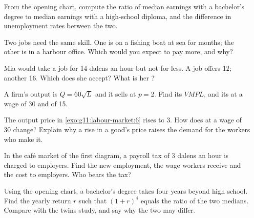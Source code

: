 \begin{exercise}[$\star$]\label{exo:g11:labour-market:3}
From the opening chart, compute the ratio of median earnings with a bachelor's degree to median earnings with a high-school diploma, and the difference in
unemployment rates between the two.
\end{exercise}

\begin{exercise}[$\star$]\label{exo:g11:labour-market:4}
Two jobs need the same skill. One is on a fishing boat at sea for months; the other is in a harbour office. Which would you expect to pay more, and why?
\end{exercise}

\begin{exercise}[$\star$]\label{exo:g11:labour-market:5}
Mia would take a job for 14 dalens an hour but not for less. A job offers 12; another 16. Which does she accept? What is her ?
\end{exercise}

\begin{exercise}[$\star\star$]\label{exo:g11:labour-market:6}
A firm's output is $Q = 60\sqrt{L}$ and it sells at $p = 2$. Find its $\mathit{VMPL}$, and its  at a wage of 30 and of 15.
\end{exercise}

\begin{exercise}[$\star\star$]\label{exo:g11:labour-market:7}
The output price in \cref{exo:g11:labour-market:6} rises to 3. How does  at a wage of 30 change? Explain why a rise in a good's price raises the demand for
the workers who make it.
\end{exercise}

\begin{exercise}[$\star\star$]\label{exo:g11:labour-market:8}
In the café market of the first diagram, a payroll tax of 3 dalens an hour is charged to employers. Find the new employment, the wage workers receive and the cost to
employers. Who bears the tax?
\end{exercise}

\begin{exercise}[$\star\star$]\label{exo:g11:labour-market:9}
Using the opening chart, a bachelor's degree takes four years beyond high school. Find the yearly return $r$ such that $(1 + r)^4$ equals the ratio of the two medians.
Compare with the twins study, and say why the two may differ.
\end{exercise}

